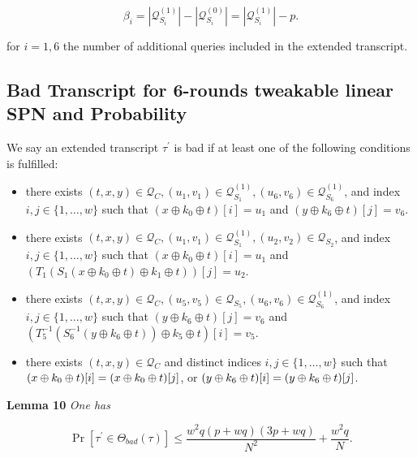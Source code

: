 $$
\beta_{i}=\left|\mathcal{Q}_{S_{i}}^{(1)}\right|-\left|\mathcal{Q}_{S_{i}}^{(0)}\right|=\left|\mathcal{Q}_{S_{i}}^{(1)}\right|-p.
$$

for $i=1, 6$ the number of additional queries included in the extended transcript.\\

\subsection{Bad Transcript for 6-rounds tweakable linear SPN and Probability}

\noindent We say an extended transcript $\tau^{\prime}$ is bad if at least one of the following conditions is fulfilled:

\begin{itemize}
  \item[\eone]
  there exists $(t, x, y) \in \mathcal{Q}_{C}, \left(u_{1}, v_{1}\right) \in \mathcal{Q}_{S_{1}}^{(1)}, \left(u_{6}, v_{6}\right) \in \mathcal{Q}_{S_{6}}^{(1)}$, and index $i, j \in \{1, \ldots, w\}$ such that $\left(x \oplus k_{0} \oplus t\right)[i]=u_1$ and $\left(y \oplus k_{6} \oplus t\right)[j]=v_6$.
  \item[\etwo]
  there exists $(t, x, y) \in \mathcal{Q}_{C}, \left(u_{1}, v_{1}\right) \in \mathcal{Q}_{S_{1}}^{(1)}, \left(u_{2}, v_{2}\right) \in \mathcal{Q}_{S_{2}}$, and index $i, j \in \{1, \ldots, w\}$ such that $\left(x \oplus k_{0} \oplus t\right)[i]=u_1$ and $\left(T_{1}\left(S_{1}\left(x \oplus k_{0} \oplus t\right) \oplus k_{1} \oplus t\right)\right)[j]=u_2$.
  \item[\ethree]
  there exists $(t, x, y) \in \mathcal{Q}_{C}, \left(u_{5}, v_{5}\right) \in \mathcal{Q}_{S_{5}}, \left(u_{6}, v_{6}\right) \in \mathcal{Q}_{S_{6}}^{(1)}$, and index $i, j \in \{1, \ldots, w\}$ such that $\left(y \oplus k_{6} \oplus t\right)[j]=v_6$ and $\left(T_{5}^{-1}\left(S_{6}^{-1}\left(y \oplus k_{6} \oplus t\right)\right) \oplus k_{5} \oplus t\right)[i]=v_5$.
  \item[\efour]
  there exists $(t, x, y) \in \mathcal{Q}_{C}$ and distinct indices $i, j \in \{1, \ldots, w\}$ such that $(x\oplus k_0 \oplus t)[i]=(x\oplus k_0 \oplus t)[j]$, or $(y\oplus k_6 \oplus t)[i]=(y\oplus k_6 \oplus t)[j]$.
\end{itemize}

\noindent \textbf{Lemma 10} \emph{One has}

\begin{equation}
\operatorname{Pr}[\tau^{\prime} \in \Theta_{bad}(\tau)] \leq \frac{w^2 q (p+w q) (3 p +w q)}{N^{2}} + \frac{w^{2} q}{N}.
\end{equation}

